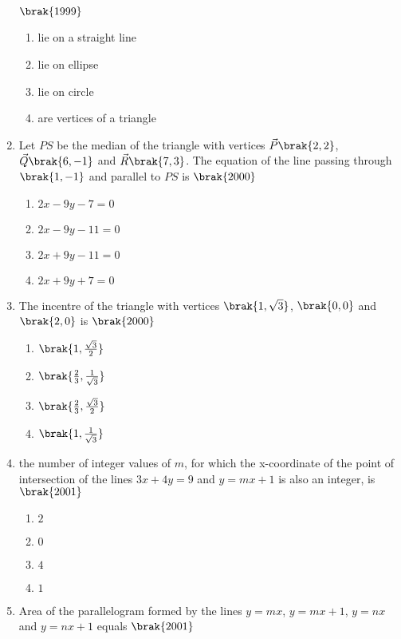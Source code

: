 \begin{enumerate}[label=\thesubsection.\arabic*.,ref=\thesubsection.\theenumi]
\hfill{$\brak{1999}$}
\begin{multicols}{2}
\begin{enumerate}
        \item lie on a straight line
        \item lie on ellipse
        \item lie on circle
        \item are vertices of a triangle 
\end{enumerate}
\end{multicols}
\item Let $PS$ be the median of the triangle with vertices $\vec{P}\brak{2,2}$, $\vec{Q}\brak{6,-1}$ and $\vec{R}\brak{7,3}$. The equation of the line passing through $\brak{1,-1}$ and parallel to $PS$ is 
\hfill{$\brak{2000}$}
\begin{multicols}{2}
\begin{enumerate}
      \item $2x-9y-7=0$  
      \item $2x-9y-11=0$
      \item $2x+9y-11=0$
      \item $2x+9y+7=0$
\end{enumerate}
\end{multicols}
\item The incentre of the triangle with vertices $\brak{1,\sqrt{3}}$, $\brak{0,0}$ and $\brak{2,0}$ is 
\hfill{$\brak{2000}$}
\begin{multicols}{4}
\begin{enumerate}
     \item $\brak{1,\frac{\sqrt{3}}{2}}$
     \item $\brak{\frac{2}{3},\frac{1}{\sqrt{3}}}$
     \item $\brak{\frac{2}{3},\frac{\sqrt{3}}{2}}$
     \item $\brak{1,\frac{1}{\sqrt{3}}}$
\end{enumerate}
\end{multicols}
\item the number of integer values of $m$, for which the x-coordinate of the point of intersection of the lines $3x+4y=9$ and $y=mx+1$ is also an integer, is 
\hfill{$\brak{2001}$}
\begin{multicols}{4}
\begin{enumerate}
    \item $2$
    \item $0$
     \item $4$
     \item $1$
\end{enumerate}
\end{multicols}
\item Area of the parallelogram formed by the lines $y=mx$, $y=mx+1$, $y=nx$ and $y=nx+1$ equals
\hfill{$\brak{2001}$}
\begin{multicols}{4}
\begin{enumerate}
    

\end{enumerate}
\end{multicols}
\end{enumerate}

